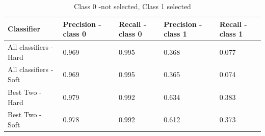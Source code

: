 \begin{table}
 \begin{tabular}{|l |l |l |l |l |}
\hline
Classifier &Precision - class 0 & Recall - class 0  &Precision - class 1 & Recall - class 1  \\ \hline
All classifiers - Hard & 0.969&  0.995&  0.368&  0.077\\
All classifiers  - Soft & 0.969 &  0.995&  0.365&   0.074\\ 
Best Two - Hard & 0.979&  0.992&  0.634&  0.383\\
Best Two  - Soft &0.978&  0.992 & 0.612 &  0.373\\ \hline
\end{tabular}
\caption{Class 0 -not selected, Class 1 selected}
\label{table:votingClassifiers}
\end{table}

